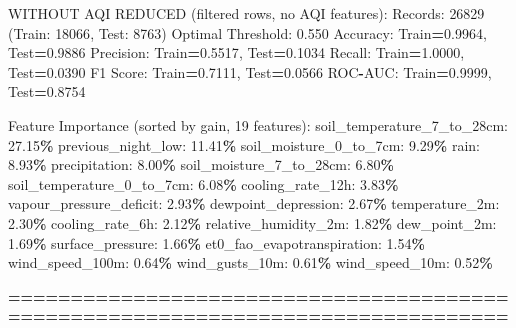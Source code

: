 \documentclass[
  letterpaper,
  DIV=11,
  numbers=noendperiod]{scrartcl}
\newenvironment{Shaded}{\begin{snugshade}}{\end{snugshade}}
\newcommand{\BuiltInTok}[1]{#1}
\newcommand{\DecValTok}[1]{\textcolor[rgb]{0.00,0.00,0.81}{#1}}
\newcommand{\FloatTok}[1]{\textcolor[rgb]{0.00,0.00,0.81}{#1}}
\newcommand{\NormalTok}[1]{#1}
\newcommand{\OperatorTok}[1]{\textcolor[rgb]{0.81,0.36,0.00}{\textbf{#1}}}
\begin{document}
\begin{Shaded}
\begin{Highlighting}[]
\NormalTok{WITHOUT AQI REDUCED (filtered rows, no AQI features):}
\NormalTok{  Records: }\DecValTok{26829}\NormalTok{ (Train: }\DecValTok{18066}\NormalTok{, Test: }\DecValTok{8763}\NormalTok{)}
\NormalTok{  Optimal Threshold: }\FloatTok{0.550}
\NormalTok{  Accuracy: Train}\OperatorTok{=}\FloatTok{0.9964}\NormalTok{, Test}\OperatorTok{=}\FloatTok{0.9886}
\NormalTok{  Precision: Train}\OperatorTok{=}\FloatTok{0.5517}\NormalTok{, Test}\OperatorTok{=}\FloatTok{0.1034}
\NormalTok{  Recall: Train}\OperatorTok{=}\FloatTok{1.0000}\NormalTok{, Test}\OperatorTok{=}\FloatTok{0.0390}
\NormalTok{  F1 Score: Train}\OperatorTok{=}\FloatTok{0.7111}\NormalTok{, Test}\OperatorTok{=}\FloatTok{0.0566}
\NormalTok{  ROC}\OperatorTok{{-}}\NormalTok{AUC: Train}\OperatorTok{=}\FloatTok{0.9999}\NormalTok{, Test}\OperatorTok{=}\FloatTok{0.8754}

\NormalTok{  Feature Importance (}\BuiltInTok{sorted}\NormalTok{ by gain, }\DecValTok{19}\NormalTok{ features):}
\NormalTok{    soil\_temperature\_7\_to\_28cm: }\FloatTok{27.15}\OperatorTok{\%}
\NormalTok{    previous\_night\_low: }\FloatTok{11.41}\OperatorTok{\%}
\NormalTok{    soil\_moisture\_0\_to\_7cm: }\FloatTok{9.29}\OperatorTok{\%}
\NormalTok{    rain: }\FloatTok{8.93}\OperatorTok{\%}
\NormalTok{    precipitation: }\FloatTok{8.00}\OperatorTok{\%}
\NormalTok{    soil\_moisture\_7\_to\_28cm: }\FloatTok{6.80}\OperatorTok{\%}
\NormalTok{    soil\_temperature\_0\_to\_7cm: }\FloatTok{6.08}\OperatorTok{\%}
\NormalTok{    cooling\_rate\_12h: }\FloatTok{3.83}\OperatorTok{\%}
\NormalTok{    vapour\_pressure\_deficit: }\FloatTok{2.93}\OperatorTok{\%}
\NormalTok{    dewpoint\_depression: }\FloatTok{2.67}\OperatorTok{\%}
\NormalTok{    temperature\_2m: }\FloatTok{2.30}\OperatorTok{\%}
\NormalTok{    cooling\_rate\_6h: }\FloatTok{2.12}\OperatorTok{\%}
\NormalTok{    relative\_humidity\_2m: }\FloatTok{1.82}\OperatorTok{\%}
\NormalTok{    dew\_point\_2m: }\FloatTok{1.69}\OperatorTok{\%}
\NormalTok{    surface\_pressure: }\FloatTok{1.66}\OperatorTok{\%}
\NormalTok{    et0\_fao\_evapotranspiration: }\FloatTok{1.54}\OperatorTok{\%}
\NormalTok{    wind\_speed\_100m: }\FloatTok{0.64}\OperatorTok{\%}
\NormalTok{    wind\_gusts\_10m: }\FloatTok{0.61}\OperatorTok{\%}
\NormalTok{    wind\_speed\_10m: }\FloatTok{0.52}\OperatorTok{\%}

\OperatorTok{================================================================================}


\end{Highlighting}
\end{Shaded}
\end{document}
